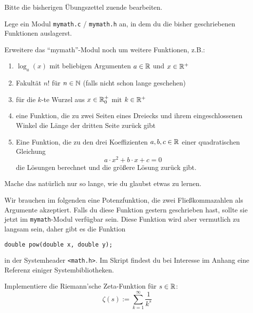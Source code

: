 \documentclass{uebungszettel}
\begin{document}
Bitte die bisherigen Übungszettel zuende bearbeiten.

\begin{aufg} Lege ein Modul \verb|mymath.c| / \verb|mymath.h| an, in dem du die bisher geschriebenen Funktionen auslagerst.
\end{aufg}
\begin{aufg}
Erweitere das "`mymath"'-Modul noch um weitere Funktionen, z.B.:
\begin{enumerate}
  \item $\log_a(x)$ mit beliebigen Argumenten $a \in \mathbb{R}$ und $x \in \mathbb{R}^+$
  \item Fakultät $n!$ für $n \in \mathbb{N}$ (falls nicht schon lange geschehen)
  \item für die $k$-te Wurzel aus $x\in \mathbb{R}^+_0$ mit $k \in \mathbb{R}^+$
  \item eine Funktion, die zu zwei Seiten eines Dreiecks und ihrem eingeschlossenen Winkel die Länge der dritten Seite zurück gibt
  \item Eine Funktion, die zu den drei Koeffizienten $a, b, c \in \mathbb{R}$ einer quadratischen Gleichung $$
a \cdot x^2 + b \cdot x + c = 0 $$
die Lösungen berechnet und die größere Lösung zurück gibt. 
\end{enumerate}
Mache das natürlich nur so lange, wie du glaubst etwas zu lernen.
\end{aufg}

Wir brauchen im folgenden eine Potenzfunktion, die zwei Fließkommazahlen als Argumente akzeptiert. Falls du diese Funktion gestern geschrieben hast, sollte sie jetzt im \verb|mymath|-Modul verfügbar sein. Diese Funktion wird aber vermutlich zu langsam sein, daher gibt es die Funktion 

\begin{verbatim}
double pow(double x, double y);
\end{verbatim}

in der Systemheader \verb|<math.h>|. Im Skript findest du bei Interesse im Anhang eine Referenz einiger Systembibliotheken.

\begin{aufg}
Implementiere die Riemann'sche Zeta-Funktion für $s \in \mathbb{R}$: $$
\zeta(s) := \sum_{k=1}^\infty \frac{1}{k^s} $$
\end{aufg}
\end{document}
